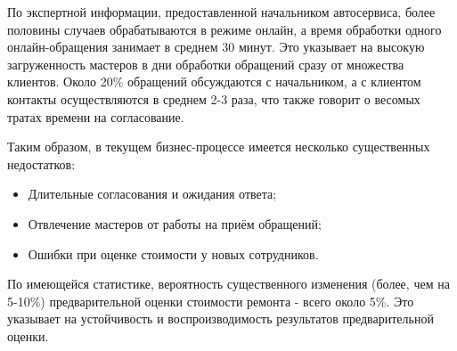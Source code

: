 По экспертной информации, предоставленной начальником автосервиса, более половины случаев обрабатываются в режиме онлайн, а время обработки одного онлайн-обращения занимает в среднем 30 минут. Это указывает на высокую загруженность мастеров в дни обработки обращений сразу от множества клиентов. Около 20\% обращений обсуждаются с начальником, а с клиентом контакты осуществляются в среднем 2-3 раза, что также говорит о весомых тратах времени на согласование.

Таким образом, в текущем бизнес-процессе имеется несколько существенных недостатков:
\begin{itemize}
    \item Длительные согласования и ожидания ответа;
    \item Отвлечение мастеров от работы на приём обращений;
    \item Ошибки при оценке стоимости у новых сотрудников.
\end{itemize}

По имеющейся статистике, вероятность существенного изменения (более, чем на 5-10\%) предварительной оценки стоимости ремонта - всего около 5\%. Это указывает на устойчивость и воспроизводимость результатов предварительной оценки.